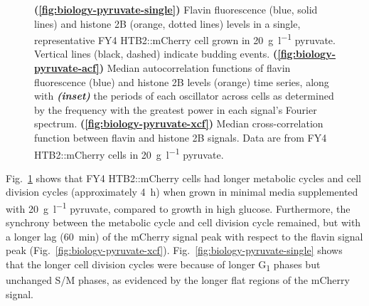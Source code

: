 \begin{figure}
  \caption[
    Flavin fluorescence and histone 2B levels in a single, representative FY4 HTB2::mCherry cell grown in \SI{20}{\gram~\litre^{-1}} pyruvate.
    Median autocorrelation functions of flavin fluorescence and histone 2B levels time series, along with the periods of each oscillator across cells.
    Median cross-correlation function between flavin and histone 2B signals.
    Data are from FY4 HTB2::mCherry cells in \SI{20}{\gram~\litre^{-1}} pyruvate.
  ]{
    \textbf{(\ref{fig:biology-pyruvate-single})}
    Flavin fluorescence (blue, solid lines) and histone 2B (orange, dotted lines) levels in a single, representative FY4 HTB2::mCherry cell grown in \SI{20}{\gram~\litre^{-1}} pyruvate.
    Vertical lines (black, dashed) indicate budding events.
    \textbf{(\ref{fig:biology-pyruvate-acf})}
    Median autocorrelation functions of flavin fluorescence (blue) and histone 2B levels (orange) time series, along with \textit{\textbf{(inset)}} the periods of each oscillator across cells as determined by the frequency with the greatest power in each signal's Fourier spectrum.
    \textbf{(\ref{fig:biology-pyruvate-xcf})}
    Median cross-correlation function between flavin and histone 2B signals.
    Data are from FY4 HTB2::mCherry cells in \SI{20}{\gram~\litre^{-1}} pyruvate.
  }
  \label{fig:biology-pyruvate}
\end{figure}

Fig.\ \ref{fig:biology-pyruvate} shows that FY4 HTB2::mCherry cells had longer metabolic cycles and cell division cycles (approximately \SI{4}{\hour}) when grown in minimal media supplemented with \SI{20}{\gram~\litre^{-1}} pyruvate, compared to growth in high glucose.
Furthermore, the synchrony between the metabolic cycle and cell division cycle remained, but with a longer lag (\SI{60}{\minute}) of the mCherry signal peak with respect to the flavin signal peak (Fig.\ \ref{fig:biology-pyruvate-xcf}).
Fig.\ \ref{fig:biology-pyruvate-single} shows that the longer cell division cycles were because of longer G\textsubscript{1} phases but unchanged S/M phases, as evidenced by the longer flat regions of the mCherry signal.



